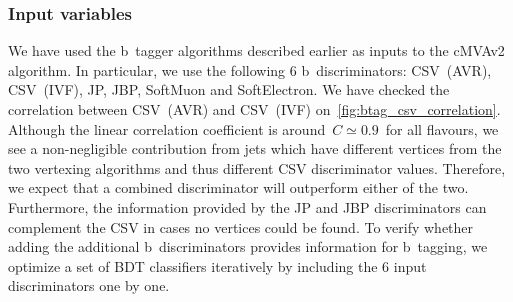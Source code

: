 \subsubsection{Input variables}
We have used the b~tagger algorithms described earlier as inputs to the cMVAv2 algorithm. In particular, we use the following 6 b~discriminators: CSV~(AVR), CSV~(IVF), JP, JBP, SoftMuon and SoftElectron. We have checked the correlation between CSV~(AVR) and CSV~(IVF) on~\cref{fig:btag_csv_correlation}. Although the linear correlation coefficient is around~$C \simeq 0.9$~for all flavours, we see a non-negligible contribution from jets which have different vertices from the two vertexing algorithms and thus different CSV discriminator values. Therefore, we expect that a combined discriminator will outperform either of the two. Furthermore, the information provided by the JP and JBP discriminators can complement the CSV in cases no vertices could be found. To verify whether adding the additional b~discriminators provides information for b~tagging, we optimize a set of BDT classifiers iteratively by including the 6 input discriminators one by one.


